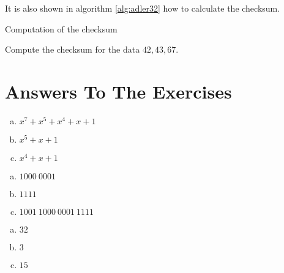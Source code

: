 It is also shown in algorithm \ref{alg:adler32} how to calculate the
\adlerchk checksum.

\begin{algorithm}[H]
  \caption{Computation of the \adlerchk checksum}\algohack{}
  \label{alg:adler32}
  \begin{algorithmic}[1]

    \EndForEach
    \State {}
    \EndProcedure
  \end{algorithmic}
\end{algorithm}

\begin{Exercise}[label={ex-adler32}]

  Compute the \adlerchk checksum for the data $42,43,67$.

\end{Exercise}

\section{Answers To The Exercises}

\begin{Answer}[ref={bin-to-poly}]
  \begin{enumerate}[(a)]
  \item $x^7 + x^5 + x^4 + x + 1$
  \item $x^5+ x + 1$
  \item $x^4 + x + 1$
  \end{enumerate}
\end{Answer}

\begin{Answer}[ref={poly-to-bin}]
  \begin{enumerate}[(a)]
  \item $1000\ 0001$
  \item $1111$
  \item $1001\ 1000\ 0001\ 1111$
  \end{enumerate}
\end{Answer}

\begin{Answer}[ref={width-poly}]

  \begin{enumerate}[(a)]
  \item $32$
  \item $3$
  \item $15$
  \end{enumerate}

\end{Answer}

